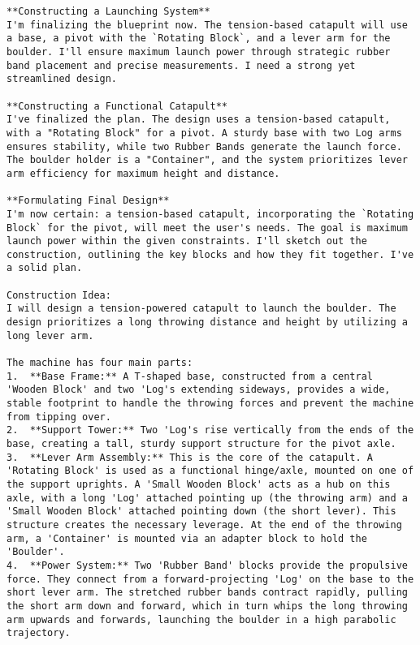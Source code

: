 \begin{lstlisting}
**Constructing a Launching System**
I'm finalizing the blueprint now. The tension-based catapult will use a base, a pivot with the `Rotating Block`, and a lever arm for the boulder. I'll ensure maximum launch power through strategic rubber band placement and precise measurements. I need a strong yet streamlined design.

**Constructing a Functional Catapult**
I've finalized the plan. The design uses a tension-based catapult, with a "Rotating Block" for a pivot. A sturdy base with two Log arms ensures stability, while two Rubber Bands generate the launch force. The boulder holder is a "Container", and the system prioritizes lever arm efficiency for maximum height and distance.

**Formulating Final Design**
I'm now certain: a tension-based catapult, incorporating the `Rotating Block` for the pivot, will meet the user's needs. The goal is maximum launch power within the given constraints. I'll sketch out the construction, outlining the key blocks and how they fit together. I've a solid plan.

Construction Idea:
I will design a tension-powered catapult to launch the boulder. The design prioritizes a long throwing distance and height by utilizing a long lever arm.

The machine has four main parts:
1.  **Base Frame:** A T-shaped base, constructed from a central 'Wooden Block' and two 'Log's extending sideways, provides a wide, stable footprint to handle the throwing forces and prevent the machine from tipping over.
2.  **Support Tower:** Two 'Log's rise vertically from the ends of the base, creating a tall, sturdy support structure for the pivot axle.
3.  **Lever Arm Assembly:** This is the core of the catapult. A 'Rotating Block' is used as a functional hinge/axle, mounted on one of the support uprights. A 'Small Wooden Block' acts as a hub on this axle, with a long 'Log' attached pointing up (the throwing arm) and a 'Small Wooden Block' attached pointing down (the short lever). This structure creates the necessary leverage. At the end of the throwing arm, a 'Container' is mounted via an adapter block to hold the 'Boulder'.
4.  **Power System:** Two 'Rubber Band' blocks provide the propulsive force. They connect from a forward-projecting 'Log' on the base to the short lever arm. The stretched rubber bands contract rapidly, pulling the short arm down and forward, which in turn whips the long throwing arm upwards and forwards, launching the boulder in a high parabolic trajectory.


\end{lstlisting}
